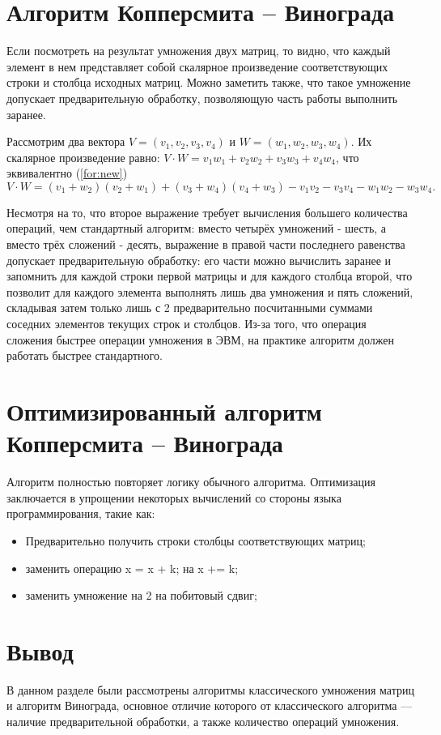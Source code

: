 \section{Алгоритм Копперсмита -- Винограда}

Если посмотреть на результат умножения двух матриц, то видно, что каждый элемент в нем представляет собой скалярное произведение соответствующих строки и столбца исходных матриц.
Можно заметить также, что такое умножение допускает предварительную обработку, позволяющую часть работы выполнить заранее.

Рассмотрим два вектора $V = (v_1, v_2, v_3, v_4)$ и $W = (w_1, w_2, w_3, w_4)$.
Их скалярное произведение равно: $V \cdot W = v_1w_1 + v_2w_2 + v_3w_3 + v_4w_4$, что эквивалентно (\ref{for:new})
\begin{equation}
    \label{for:new}
    V \cdot W = (v_1 + w_2)(v_2 + w_1) + (v_3 + w_4)(v_4 + w_3) - v_1v_2 - v_3v_4 - w_1w_2 - w_3w_4.
\end{equation}

Несмотря на то, что второе выражение требует вычисления большего количества операций, чем стандартный алгоритм: вместо четырёх умножений - шесть, а вместо трёх сложений - десять, выражение в правой части последнего равенства допускает предварительную обработку: его части можно вычислить заранее и запомнить для каждой строки первой матрицы и для каждого столбца второй, что позволит для каждого элемента выполнять лишь два умножения и пять сложений, складывая затем только лишь с 2 предварительно посчитанными суммами соседних элементов текущих строк и столбцов.
Из-за того, что операция сложения быстрее операции умножения в ЭВМ, на практике алгоритм должен работать быстрее стандартного.

\section{Оптимизированный алгоритм Копперсмита -- Винограда}

Алгоритм полностью повторяет логику обычного алгоритма. Оптимизация заключается в упрощении некоторых вычислений со стороны языка программирования, такие как:

\begin{itemize}
    \item Предварительно получить строки столбцы соответствующих матриц;
    \item заменить операцию x = x + k; на x += k;
    \item заменить умножение на 2 на побитовый сдвиг;
\end{itemize}

\section*{Вывод}
В данном разделе были рассмотрены алгоритмы классического умножения матриц и алгоритм Винограда, основное отличие которого от классического алгоритма — наличие предварительной обработки, а также количество операций умножения.
\clearpage
